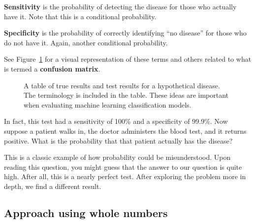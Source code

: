 \documentclass[
  letterpaper,
  DIV=11,
  numbers=noendperiod]{scrreprt}
\begin{document}
\textbf{Sensitivity} is the probability of detecting the disease for
those who actually have it. Note that this is a conditional probability.

\textbf{Specificity} is the probability of correctly identifying ``no
disease'' for those who do not have it. Again, another conditional
probability.

See Figure~\ref{fig-sens} for a visual representation of these terms and
others related to what is termed a \textbf{confusion matrix}.

\begin{figure}


\caption{\label{fig-sens}A table of true results and test results for a
hypothetical disease. The terminology is included in the table. These
ideas are important when evaluating machine learning classification
models.}

\end{figure}%

In fact, this test had a sensitivity of 100\% and a specificity of
99.9\%. Now suppose a patient walks in, the doctor administers the blood
test, and it returns positive. What is the probability that that patient
actually has the disease?

This is a classic example of how probability could be misunderstood.
Upon reading this question, you might guess that the answer to our
question is quite high. After all, this is a nearly perfect test. After
exploring the problem more in depth, we find a different result.

\subsection{Approach using whole
numbers}\label{approach-using-whole-numbers}
\end{document}
